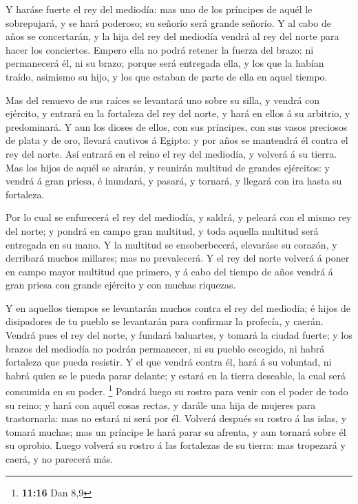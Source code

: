  Y haráse fuerte el rey del mediodía: mas uno de los
príncipes de aquél le sobrepujará, y se hará poderoso; su señorío será
grande señorío.  Y al cabo de años se concertarán, y la
hija del rey del mediodía vendrá al rey del norte para hacer los
conciertos. Empero ella no podrá retener la fuerza del brazo: ni
permanecerá él, ni su brazo; porque será entregada ella, y los que la
habían traído, asimismo su hijo, y los que estaban de parte de ella en
aquel tiempo.

 Mas del renuevo de sus raíces se levantará uno sobre su
silla, y vendrá con ejército, y entrará en la fortaleza del rey del
norte, y hará en ellos á su arbitrio, y predominará.  Y
aun los dioses de ellos, con sus príncipes, con sus vasos preciosos de
plata y de oro, llevará cautivos á Egipto: y por años se mantendrá él
contra el rey del norte.  Así entrará en el reino el rey
del mediodía, y volverá á su tierra.  Mas los hijos de
aquél se airarán, y reunirán multitud de grandes ejércitos: y vendrá á
gran priesa, é inundará, y pasará, y tornará, y llegará con ira hasta su
fortaleza.

 Por lo cual se enfurecerá el rey del mediodía, y saldrá,
y peleará con el mismo rey del norte; y pondrá en campo gran multitud, y
toda aquella multitud será entregada en su mano.  Y la
multitud se ensoberbecerá, elevaráse su corazón, y derribará muchos
millares; mas no prevalecerá.  Y el rey del norte volverá
á poner en campo mayor multitud que primero, y á cabo del tiempo de años
vendrá á gran priesa con grande ejército y con muchas riquezas.

 Y en aquellos tiempos se levantarán muchos contra el rey
del mediodía; é hijos de disipadores de tu pueblo se levantarán para
confirmar la profecía, y caerán.  Vendrá pues el rey del
norte, y fundará baluartes, y tomará la ciudad fuerte; y los brazos del
mediodía no podrán permanecer, ni su pueblo escogido, ni habrá fortaleza
que pueda resistir.  Y el que vendrá contra él, hará á su
voluntad, ni habrá quien se le pueda parar delante; y estará en la
tierra deseable, la cual será consumida en su poder. \footnote{\textbf{11:16}
  Dan 8,9}  Pondrá luego su rostro para venir con el
poder de todo su reino; y hará con aquél cosas rectas, y darále una hija
de mujeres para trastornarla: mas no estará ni será por él.
 Volverá después su rostro á las islas, y tomará muchas;
mas un príncipe le hará parar su afrenta, y aun tornará sobre él su
oprobio.  Luego volverá su rostro á las fortalezas de su
tierra: mas tropezará y caerá, y no parecerá más.

